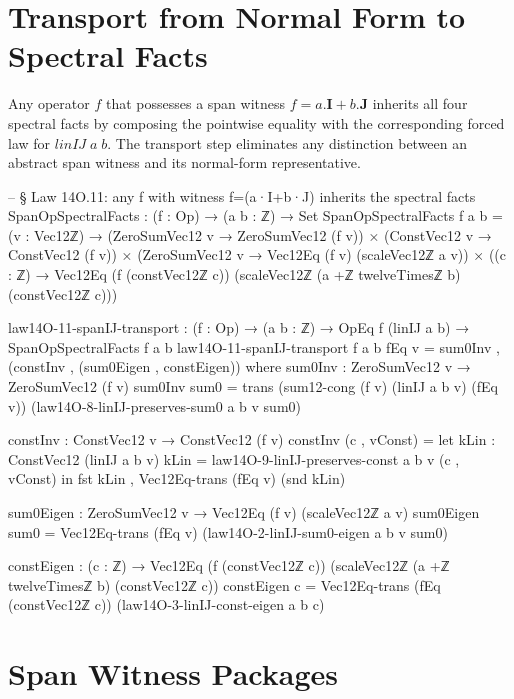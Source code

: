 \documentclass[11pt,a4paper]{book}
\def\cdot{.}%
\def\texttt#1{#1}%
\begin{document}
\section{Transport from Normal Form to Spectral Facts}

Any operator $f$ that possesses a span witness
$f = a\!\cdot\!\mathbf{I}+b\!\cdot\!\mathbf{J}$
inherits all four spectral facts by composing the pointwise
equality with the corresponding forced law for $\texttt{linIJ}\;a\;b$.  The
transport step eliminates any distinction between an abstract span witness and
its normal-form representative.

\begin{code}
-- § Law 14O.11: any f with witness f=(a·I+b·J) inherits the spectral facts
SpanOpSpectralFacts : (f : Op) → (a b : ℤ) → Set
SpanOpSpectralFacts f a b =
  (v : Vec12ℤ) →
    (ZeroSumVec12 v → ZeroSumVec12 (f v)) ×
    (ConstVec12 v → ConstVec12 (f v)) ×
    (ZeroSumVec12 v → Vec12Eq (f v) (scaleVec12ℤ a v)) ×
    ((c : ℤ) → Vec12Eq (f (constVec12ℤ c))
                      (scaleVec12ℤ (a +ℤ twelveTimesℤ b) (constVec12ℤ c)))

law14O-11-spanIJ-transport : (f : Op) → (a b : ℤ) → OpEq f (linIJ a b) → SpanOpSpectralFacts f a b
law14O-11-spanIJ-transport f a b fEq v =
  sum0Inv ,
  (constInv ,
   (sum0Eigen ,
    constEigen))
  where
    sum0Inv : ZeroSumVec12 v → ZeroSumVec12 (f v)
    sum0Inv sum0 =
      trans
        (sum12-cong (f v) (linIJ a b v) (fEq v))
        (law14O-8-linIJ-preserves-sum0 a b v sum0)

    constInv : ConstVec12 v → ConstVec12 (f v)
    constInv (c , vConst) =
      let
        kLin : ConstVec12 (linIJ a b v)
        kLin = law14O-9-linIJ-preserves-const a b v (c , vConst)
      in
      fst kLin , Vec12Eq-trans (fEq v) (snd kLin)

    sum0Eigen : ZeroSumVec12 v → Vec12Eq (f v) (scaleVec12ℤ a v)
    sum0Eigen sum0 =
      Vec12Eq-trans
        (fEq v)
        (law14O-2-linIJ-sum0-eigen a b v sum0)

    constEigen : (c : ℤ) → Vec12Eq (f (constVec12ℤ c))
                           (scaleVec12ℤ (a +ℤ twelveTimesℤ b) (constVec12ℤ c))
    constEigen c =
      Vec12Eq-trans
        (fEq (constVec12ℤ c))
        (law14O-3-linIJ-const-eigen a b c)
\end{code}


\section{Span Witness Packages}
\end{document}
